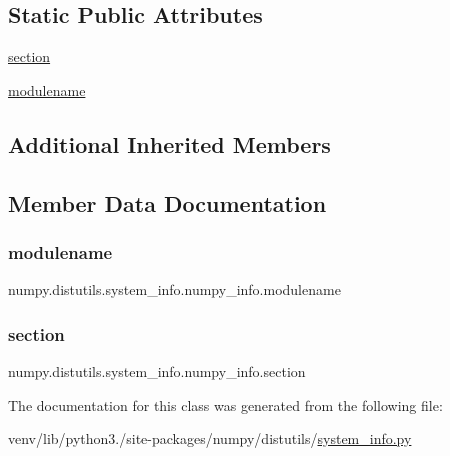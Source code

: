 \subsection*{Static Public Attributes}
\begin{DoxyCompactItemize}
\item 
\hyperlink{classnumpy_1_1distutils_1_1system__info_1_1numpy__info_af96b47df50f335eac844fc226c9b63a9}{section}
\item 
\hyperlink{classnumpy_1_1distutils_1_1system__info_1_1numpy__info_a74a61d3d823775741ab66654e418b3ad}{modulename}
\end{DoxyCompactItemize}
\subsection*{Additional Inherited Members}


\subsection{Member Data Documentation}
\mbox{\label{classnumpy_1_1distutils_1_1system__info_1_1numpy__info_a74a61d3d823775741ab66654e418b3ad}} 
\subsubsection{\texorpdfstring{modulename}{modulename}}
{\footnotesize\ttfamily numpy.\+distutils.\+system\+\_\+info.\+numpy\+\_\+info.\+modulename\hspace{0.3cm}{\ttfamily [static]}}

\mbox{\label{classnumpy_1_1distutils_1_1system__info_1_1numpy__info_af96b47df50f335eac844fc226c9b63a9}} 
\subsubsection{\texorpdfstring{section}{section}}
{\footnotesize\ttfamily numpy.\+distutils.\+system\+\_\+info.\+numpy\+\_\+info.\+section\hspace{0.3cm}{\ttfamily [static]}}



The documentation for this class was generated from the following file\+:\begin{DoxyCompactItemize}
\item 
venv/lib/python3./site-\/packages/numpy/distutils/\hyperlink{system__info_8py}{system\+\_\+info.\+py}\end{DoxyCompactItemize}
